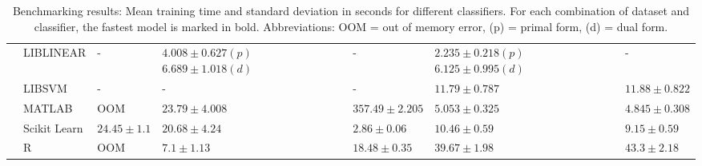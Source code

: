 \documentclass[utf8]{frontiersSCNS} %
\begin{document}
\begin{table}
\begin{tabular}{ |p{1.1cm}|p{1.7cm}|p{2cm}|p{2.1cm}|p{2cm}|p{2.1cm}|p{2cm}|}
  & LIBLINEAR & - & $\mathbf{4.008}\pm0.627(p)$ $6.689\pm1.018(d)$ & - & $2.235\pm0.218(p)$ $6.125\pm0.995(d)$ & - \\
\cline{2-7}
  & LIBSVM & - & - & - & $11.79\pm0.787$ & $11.88\pm0.822$ \\
\cline{2-7}
  & MATLAB & OOM & $23.79\pm4.008$ & $357.49\pm2.205$ & $5.053\pm0.325$ & $4.845\pm0.308$\\
\cline{2-7}
   & Scikit Learn & $24.45\pm1.1$ & $20.68\pm4.24$ & $2.86\pm0.06$ & $10.46\pm0.59$ & $9.15\pm0.59$\\
\cline{2-7}
  & R & OOM & $7.1\pm1.13$ & $18.48\pm0.35$ & $39.67\pm1.98$ & $43.3\pm2.18$ \\\hline
\end{tabular}
\caption{Benchmarking results: Mean training time and standard deviation in seconds for different classifiers. For each combination of dataset and classifier, the fastest model is marked in bold. Abbreviations: OOM = out of memory error, (p) = primal form, (d) = dual form.}
\label{tab:classification}
\end{table}
\end{document}
